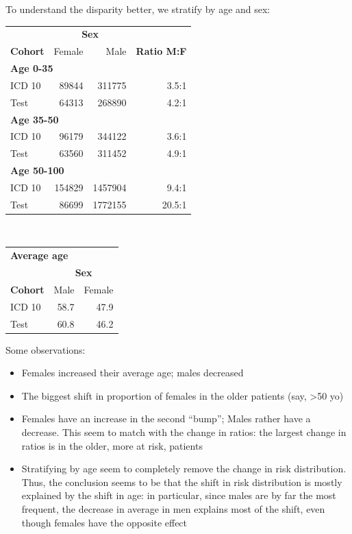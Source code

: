\documentclass[english]{article}
\begin{document}
\newpage
\clearpage

To understand the disparity better, we stratify by age and sex:
\begin{table}[h]
\centering
\begin{tabular}{lrrr}
\toprule
 & \multicolumn{2}{c}{\textbf{Sex}} & \\ \cmidrule{2-3}
 \textbf{Cohort} & Female & Male & \textbf{Ratio M:F} \\
\midrule
\multicolumn{4}{l}{\textbf{Age 0-35}} \\ \addlinespace
  ICD 10 &  89844  &  311775  &  3.5:1\\
  Test   & 64313 & 268890 &   4.2:1\\
\midrule
\multicolumn{4}{l}{\textbf{Age 35-50}} \\ \addlinespace
  ICD 10&  96179 & 344122 &   3.6:1\\
  Test  &  63560 & 311452   & 4.9:1\\
\midrule
\multicolumn{4}{l}{\textbf{Age 50-100}} \\ \addlinespace
  ICD 10 & 154829 &1457904  &  9.4:1\\
  Test   & 86699  &1772155 &   20.5:1\\
\bottomrule
\end{tabular}
\\

\begin{tabular}{lrr}
\toprule
\multicolumn{3}{l}{\textbf{Average age}} \\
 & \multicolumn{2}{c}{\textbf{Sex}} \\ \cmidrule{2-3}
 \textbf{Cohort} & Male & Female \\
\midrule
  ICD 10 &  58.7  &  47.9  \\
  Test   & 60.8 & 46.2\\
\bottomrule
\end{tabular}
\end{table}

Some observations:
\begin{itemize}
	\item Females increased their average age; males decreased 
	\item The biggest shift in proportion of females in the older patients (say, >50 yo)
	\item Females have an increase in the second ``bump''; Males rather have a decrease.
	This seem to match with the change in ratios: the largest change in ratios is in the
	older, more at risk, patients
	\item Stratifying by age seem to completely remove the change in risk distribution. Thus,
	the conclusion seems to be that the shift in risk distribution is mostly explained by
	the shift in age: in particular, since males are by far the most frequent, the decrease 
	in average in men explains most of the shift, even though females have the opposite effect
\end{itemize}
\end{document}

